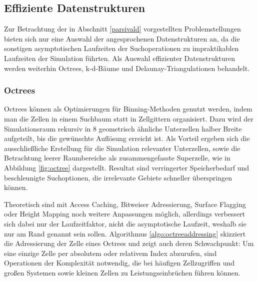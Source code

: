 
\subsection{Effiziente Datenstrukturen}

Zur Betrachtung der in Abschnitt \ref{parsivald} vorgestellten Problemstellungen bieten sich nur eine Auswahl der angesprochenen Datenstrukturen an, da die sonstigen asymptotischen Laufzeiten der Suchoperationen zu impraktikablen Laufzeiten der Simulation führten.
Als Auswahl effizienter Datenstrukturen werden weiterhin Octrees, k-d-Bäume und Delaunay-Triangulationen behandelt.

\subsubsection{Octrees}\label{dataoctree}
Octrees können als Optimierungen für Binning-Methoden genutzt werden, indem man die Zellen in einem Suchbaum statt in Zellgittern organisiert.
Dazu wird der Simulationsraum rekursiv in 8 geometrisch ähnliche Unterzellen halber Breite aufgeteilt, bis die gewünschte Auflösung erreicht ist.
Als Vorteil ergeben sich die ausschließliche Erstellung für die Simulation relevanter Unterzellen, sowie die Betrachtung leerer Raumbereiche als zusammengefasste Superzelle, wie in Abbildung \ref{fig:octree} dargestellt.
Resultat sind verringerter Speicherbedarf und beschleunigte Suchoptionen, die irrelevante Gebiete schneller überspringen können.

Theoretisch sind mit Access Caching, Bitweiser Adressierung, Surface Flagging oder Height Mapping noch weitere Anpassungen möglich, allerdings verbessert sich dabei nur der Laufzeitfaktor, nicht die asymptotische Laufzeit, weshalb sie nur am Rand genannt sein sollen.
Algorithmus \ref{algo:octreeaddressing} skizziert die Adressierung der Zelle eines Octrees und zeigt auch deren Schwachpunkt:
Um eine einzige Zelle per absolutem oder relativem Index abzurufen, sind Operationen der Komplexität  notwendig, die bei häufigen Zellzugriffen und großen Systemen sowie kleinen Zellen zu Leistungseinbrüchen führen können.

